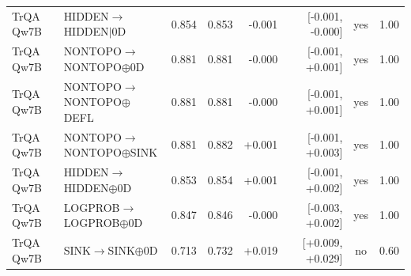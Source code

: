 \begin{longtable}{llrrrrcc}
TrQA Qw7B & HIDDEN$\to$HIDDEN$\mid$0D & 0.854 & 0.853 & -0.001 & [-0.001, -0.000] & yes & 1.00 \\
TrQA Qw7B & NONTOPO$\to$NONTOPO$\oplus$0D & 0.881 & 0.881 & -0.000 & [-0.001, +0.001] & yes & 1.00 \\
TrQA Qw7B & NONTOPO$\to$NONTOPO$\oplus$DEFL & 0.881 & 0.881 & -0.000 & [-0.001, +0.001] & yes & 1.00 \\
TrQA Qw7B & NONTOPO$\to$NONTOPO$\oplus$SINK & 0.881 & 0.882 & +0.001 & [-0.001, +0.003] & yes & 1.00 \\
TrQA Qw7B & HIDDEN$\to$HIDDEN$\oplus$0D & 0.853 & 0.854 & +0.001 & [-0.001, +0.002] & yes & 1.00 \\
TrQA Qw7B & LOGPROB$\to$LOGPROB$\oplus$0D & 0.847 & 0.846 & -0.000 & [-0.003, +0.002] & yes & 1.00 \\
TrQA Qw7B & SINK$\to$SINK$\oplus$0D & 0.713 & 0.732 & +0.019 & [+0.009, +0.029] & no & 0.60 \\
\bottomrule
\end{longtable}
